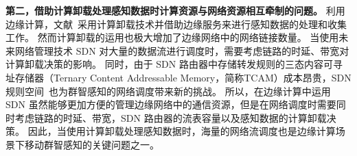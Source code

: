 
\textbf{第二，借助计算卸载处理感知数据时计算资源与网络资源相互牵制的问题。}
利用边缘计算，文献~采用计算卸载技术并借助边缘服务来进行感知数据的处理和收集工作。
然而计算卸载的运用也极大增加了边缘网络中的网络链接数量。
当使用未来网络管理技术 SDN 对大量的数据流进行调度时，需要考虑链路的时延、带宽对计算卸载决策的影响。
同时，由于 SDN 路由器中存储转发规则的三态内容可寻址存储器（Ternary Content Addressable Memory，简称TCAM）成本昂贵，SDN 规则空间~\cite{Katta:2014es}也为群智感知的网络调度带来新的挑战。
所以，在边缘计算中运用 SDN 虽然能够更加方便的管理边缘网络中的通信资源，但是在网络调度时需要同时考虑链路的时延、带宽，SDN 路由器的流表容量以及感知数据的计算卸载决策。
因此，当使用计算卸载处理感知数据时，海量的网络流调度也是边缘计算场景下移动群智感知的关键问题之一。



